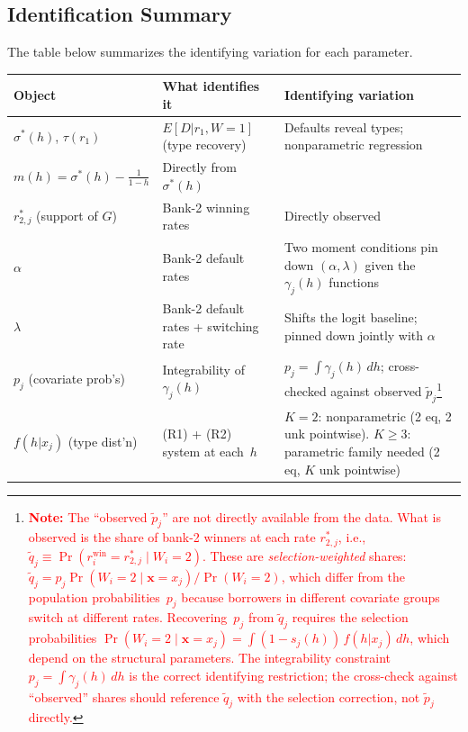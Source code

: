 \documentclass[12pt]{article}
\theoremstyle{plain}
\theoremstyle{plain}
\theoremstyle{definition}
\theoremstyle{remark}
\begin{document}
\subsection{Identification Summary}

The table below summarizes the identifying variation for each parameter.

\begin{center}
\renewcommand{\arraystretch}{1.5}
\begin{tabular}{p{4cm}p{4.5cm}p{5cm}}
\toprule
\textbf{Object} & \textbf{What identifies it} & \textbf{Identifying variation} \\
\midrule
$\sigma^*(h)$, $\tau(r_1)$ & $E[D|r_1, W\!=\!1]$ (type recovery) & Defaults reveal types; nonparametric regression \\[4pt]
$m(h) = \sigma^*(h) - \frac{1}{1-h}$ & Directly from $\sigma^*(h)$ & \\[4pt]
$r_{2,j}^*$ (support of $G$) & Bank-2 winning rates & Directly observed \\[4pt]
$\alpha$ & Bank-2 default rates & Two moment conditions pin down $(\alpha, \lambda)$ given the $\gamma_j(h)$ functions  \\[4pt]
$\lambda$ & Bank-2 default rates + switching rate & Shifts the logit baseline; pinned down jointly with $\alpha$ \\[4pt]
$p_j$ (covariate prob's) & Integrability of $\gamma_j(h)$ & $p_j = \int \gamma_j(h)\, dh$; cross-checked against observed $\tilde{p}_j$\footnote{\textcolor{red}{\textbf{Note:} The ``observed $\tilde{p}_j$'' are not directly available from the data.  What is observed is the share of bank-2 winners at each rate $r_{2,j}^*$, i.e., $\tilde{q}_j \equiv \Pr(r_i^{\text{win}} = r_{2,j}^* \mid W_i = 2)$.  These are \emph{selection-weighted} shares: $\tilde{q}_j = p_j \Pr(W_i = 2 \mid \mathbf{x} = x_j) / \Pr(W_i = 2)$, which differ from the population probabilities~$p_j$ because borrowers in different covariate groups switch at different rates.  Recovering~$p_j$ from $\tilde{q}_j$ requires the selection probabilities $\Pr(W_i = 2 \mid \mathbf{x} = x_j) = \int (1 - s_j(h))\, f(h|x_j)\, dh$, which depend on the structural parameters.  The integrability constraint $p_j = \int \gamma_j(h)\, dh$ is the correct identifying restriction; the cross-check against ``observed'' shares should reference $\tilde{q}_j$ with the selection correction, not $\tilde{p}_j$ directly.}} \\[4pt]
$f(h|x_j)$ (type dist'n) & (R1) + (R2) system at each~$h$ & $K = 2$: nonparametric (2 eq, 2 unk pointwise). $K \geq 3$: parametric family needed (2 eq, $K$ unk pointwise) \\[4pt]
\bottomrule
\end{tabular}
\end{center}
\end{document}
